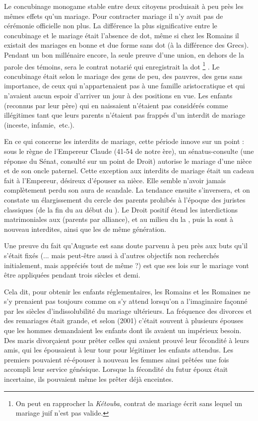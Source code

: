  Le concubinage monogame stable entre deux citoyens produisait à peu près les mêmes effets qu'un mariage. Pour contracter mariage il n'y avait pas de cérémonie officielle non plus. La différence la plus significative entre le concubinage et le mariage était l'absence de dot, même si chez les Romains il existait des mariages en bonne et due forme sans dot (à la différence des Grecs). Pendant un bon millénaire encore, la seule preuve d'une union, en dehors de la parole des témoins, sera le contrat notarié qui enregistrait la dot%
\footnote{On peut en rapprocher la \emph{Kétouba}, contrat de mariage écrit sans lequel un mariage juif n'est pas valide.}%
. Le concubinage était selon  le mariage des gens de peu, des pauvres, des gens sans importance, de ceux qui n'appartenaient pas à une famille aristocratique et qui n'avaient aucun espoir d'arriver un jour à des positions en vue. Les enfants (reconnus par leur père) qui en naissaient n'étaient pas considérés comme illégitimes tant que leurs parents n'étaient pas frappés d'un interdit de mariage (inceste, infamie,~etc.). 

 En ce qui concerne les interdits de mariage, cette période innove sur un point : sous le règne de l'Empereur Claude (41-54 de notre ère), un sénatus-consulte (une réponse du Sénat, consulté sur un point de Droit) autorise le mariage d'une nièce et de son oncle paternel. Cette exception aux interdits de mariage était un cadeau fait à l'Empereur, désireux d'épouser sa nièce. Elle semble n'avoir jamais complètement perdu son aura de scandale. La tendance ensuite s'inversera, et on constate un élargissement du cercle des parents prohibés à l'époque des juristes classiques (de la fin du  au début du ). Le Droit positif étend les interdictions matrimoniales aux  (parents par alliance), et au milieu du  la , puis la  sont à nouveau interdites, ainsi que les  de même génération.

 Une preuve du fait qu'Auguste est sans doute parvenu à peu près aux buts qu'il s'était fixés (... mais peut-être aussi à d'autres objectifs non recherchés initialement, mais appréciés tout de même ?) est que ses lois sur le mariage vont être appliquées pendant trois siècles et demi. 

 Cela dit, pour obtenir les enfants réglementaires, les Romains et les Romaines ne s'y prenaient pas toujours comme on s'y attend lorsqu'on a l'imaginaire façonné par les siècles d'indissolubilité du mariage ultérieurs. La fréquence des divorces et des remariages était grande, et selon  (2001) c'était souvent à plusieurs épouses que les hommes demandaient les enfants dont ils avaient un impérieux besoin. Des maris divorçaient pour prêter celles qui avaient prouvé leur fécondité à leurs amis, qui les épousaient à leur tour pour légitimer les enfants attendus. Les premiers pouvaient ré-épouser à nouveau les femmes ainsi prêtées une fois accompli leur service génésique. Lorsque la fécondité du futur époux était incertaine, ils pouvaient même les prêter déjà enceintes. 


